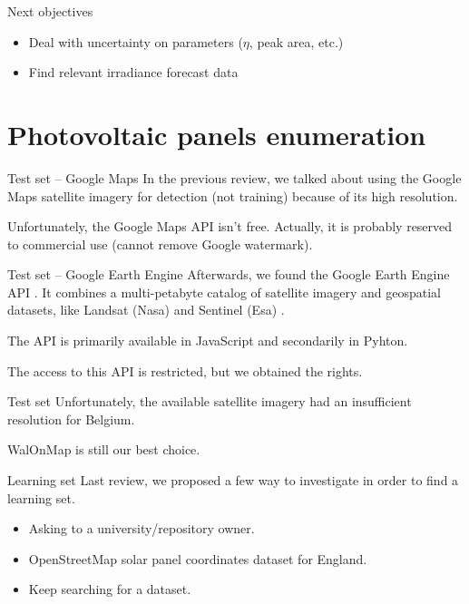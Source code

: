 \documentclass[12pt]{beamer}
\begin{document}
\begin{frame}{Next objectives}
    \begin{itemize}
        \item Deal with uncertainty on parameters ($\eta$, peak area, etc.)
        \item Find relevant irradiance forecast data
    \end{itemize}
\end{frame}

\section{Photovoltaic panels enumeration}

\begin{frame}{Test set -- Google Maps}
    In the previous review, we talked about using the Google Maps satellite imagery for detection (not training) because of its \alert{high resolution}.
    
    Unfortunately, the Google Maps API \alert{isn't} free. Actually, it is probably reserved to commercial use (cannot remove Google watermark).
\end{frame}

\begin{frame}{Test set -- Google Earth Engine}
    Afterwards, we found the \alert{Google Earth Engine} API \cite{earthengine}. It combines a multi-petabyte catalog of satellite imagery and geospatial datasets, like \alert{Landsat} (Nasa) \cite{landsat} and \alert{Sentinel} (Esa) \cite{sentinel}.
    
    The API is primarily available in \alert{JavaScript} and secondarily in \alert{Pyhton}.
    
    The access to this API is restricted, but we obtained the rights.
\end{frame}

\begin{frame}{Test set}
    Unfortunately, the available satellite imagery had an \alert{insufficient resolution} for Belgium.
    
    \alert{WalOnMap} is still our best choice.
\end{frame}

\begin{frame}{Learning set}
    Last review, we proposed a few way to investigate in order to find a learning set.
    
    \begin{itemize}
        \item Asking to a university/repository owner. 
        \item OpenStreetMap solar panel coordinates dataset for England. 
        \item Keep searching for a dataset. 
    \end{itemize}
\end{frame}
\end{document}

